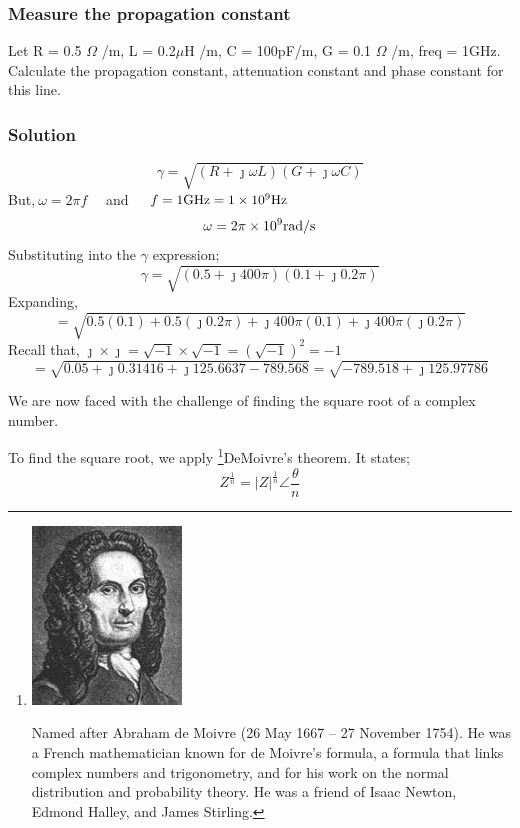 \begin{exmp}
\subsubsection*{Measure the propagation constant}
Let R = 0.5 $\Omega$ /m, L = 0.2$\mu$H /m, C = 100pF/m, G = 0.1 $\Omega$ /m, freq = 1GHz. Calculate the propagation constant, attenuation constant and phase constant for this line.

\subsubsection*{Solution}
\[ \gamma = \sqrt{(R+\jmath\omega L)(G + \jmath\omega C)}\]
But,$ \ \omega = 2\pi f\quad$ and $\quad f = 1\textnormal{GHz} = 1 \times 10^9 \textnormal{Hz} $ 
\[\omega = 2\pi \times 10^9\textnormal{rad/s}\]
Substituting into the $ \gamma $ expression;
\[\gamma = \sqrt{(0.5 + \jmath 400\pi)(0.1 + \jmath 0.2\pi)}\]
Expanding,
\[ = \sqrt{0.5(0.1) + 0.5(\jmath 0.2\pi) + \jmath 400\pi(0.1) + \jmath 400\pi(\jmath 0.2\pi)}\]
Recall  that, $ \jmath \times \jmath = \sqrt{-1} \times \sqrt{-1} = (\sqrt{-1})^2 = -1 $
\begin{dmath*}
=\sqrt{0.05 + \jmath 0.31416 +\jmath 125.6637 - 789.568}
= \sqrt{-789.518 + \jmath 125.97786}
\end{dmath*}

We are now faced with the challenge of finding the square root of a complex number.

To find the square root, we apply \footnote{
\includegraphics[scale=0.3]{./graphics/demoivre}

Named after Abraham de Moivre (26 May 1667 – 27 November 1754). He was a French mathematician known for de Moivre's formula, a formula that links complex numbers and trigonometry, and for his work on the normal distribution and probability theory. He was a friend of Isaac Newton, Edmond Halley, and James Stirling.
}DeMoivre's theorem. It states; 
\begin{equation*}
Z^{\frac{1}{n}} = |Z|^{\frac{1}{n}}\angle\frac{\theta}{n}
\end{equation*}


\end{exmp}
